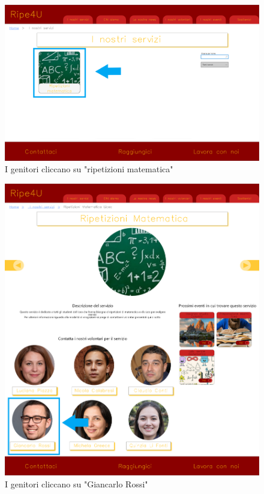     \begin{figure}[H]
        \centering
        \includegraphics[scale=0.3]{resources/images/scenario1-3.png}
        \caption{I genitori cliccano su "ripetizioni matematica"}
    \end{figure}
    \begin{figure}[H]
        \centering
        \includegraphics[scale=0.3]{resources/images/scenario1-4.png}
        \caption{I genitori cliccano su "Giancarlo Rossi"}
    \end{figure}
